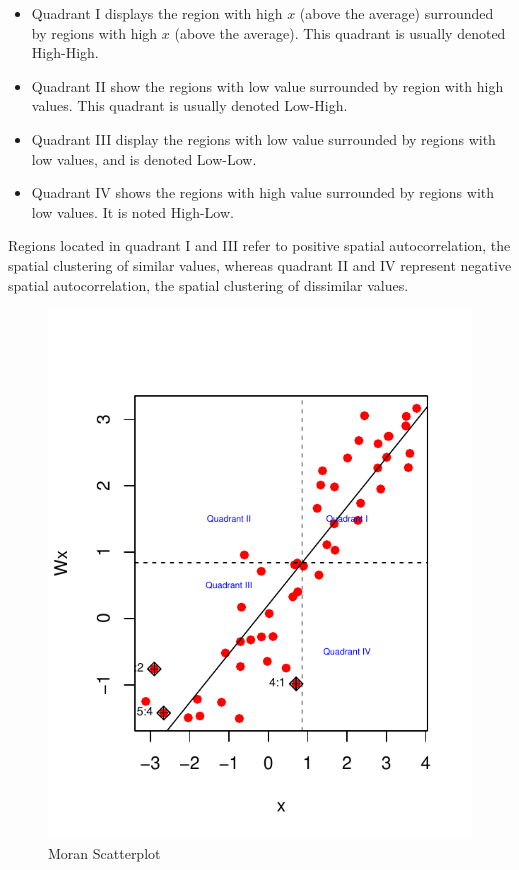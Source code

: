 \documentclass[english,12pt]{book}\usepackage[]{graphicx}\usepackage[]{xcolor}
\makeatletter
\def\maxwidth{ %
  \ifdim\Gin@nat@width>\linewidth
    \linewidth
  \else
    \Gin@nat@width
  \fi
}
\newenvironment{knitrout}{}{} %
\makeatother
\begin{document}
\begin{itemize}
  \item Quadrant I displays the region with high $x$ (above the average) surrounded by regions with high $x$ (above the average). This quadrant is usually  denoted High-High.
  \item Quadrant II show the regions with low value surrounded by region with high values. This quadrant is usually denoted Low-High.
  \item Quadrant III display the regions with low value surrounded by regions with low values, and is denoted Low-Low.
  \item Quadrant IV shows the regions with high value surrounded by regions with low values. It is noted High-Low.
\end{itemize}

Regions located in quadrant I and III refer to positive spatial autocorrelation, the spatial clustering of similar values, whereas quadrant II and IV represent negative spatial autocorrelation, the spatial clustering of dissimilar values. 

\begin{figure}[ht]
  \caption{Moran Scatterplot}\label{fig:moran_scatterplot}
\begin{knitrout}
\color{fgcolor}

{\centering \includegraphics[width=\maxwidth]{figure/moran-1} 

}


\end{knitrout}
\end{figure}
\end{document}
